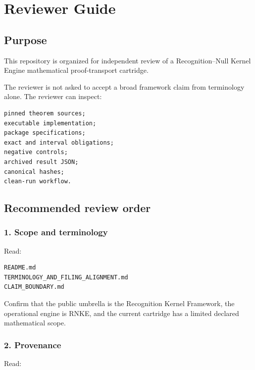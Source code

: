 \hypertarget{reviewer-guide}{%
\chapter{Reviewer Guide}\label{reviewer-guide}}

\hypertarget{purpose}{%
\section{Purpose}\label{purpose}}

This repository is organized for independent review of a Recognition--Null Kernel Engine mathematical proof-transport cartridge.

The reviewer is not asked to accept a broad framework claim from terminology alone. The reviewer can inspect:

\begin{verbatim}
pinned theorem sources;
executable implementation;
package specifications;
exact and interval obligations;
negative controls;
archived result JSON;
canonical hashes;
clean-run workflow.
\end{verbatim}

\hypertarget{recommended-review-order}{%
\section{Recommended review order}\label{recommended-review-order}}

\hypertarget{scope-and-terminology}{%
\subsection{1. Scope and terminology}\label{scope-and-terminology}}

Read:

\begin{verbatim}
README.md
TERMINOLOGY_AND_FILING_ALIGNMENT.md
CLAIM_BOUNDARY.md
\end{verbatim}

Confirm that the public umbrella is the Recognition Kernel Framework, the operational engine is RNKE, and the current cartridge has a limited declared mathematical scope.

\hypertarget{provenance}{%
\subsection{2. Provenance}\label{provenance}}

Read:

